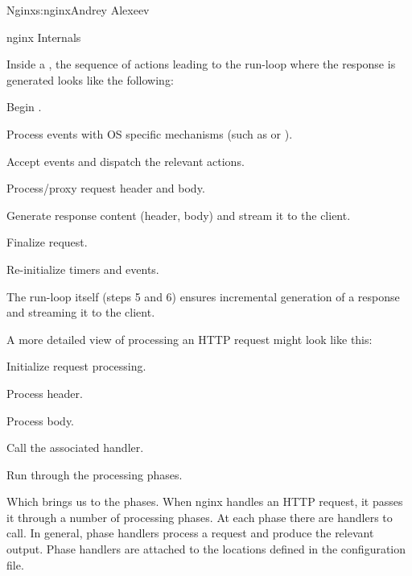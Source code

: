 \begin{aosachapter}{Nginx}{s:nginx}{Andrey Alexeev}
\begin{aosasect1}{nginx Internals}
\begin{aosaitemize}
\end{aosaitemize}

Inside a , the sequence of actions leading to the
run-loop where the response is generated looks like the following:

\begin{aosaenumerate}

\item Begin .

\item Process events with OS specific mechanisms (such as 
  or ).

\item Accept events and dispatch the relevant actions.

\item Process/proxy request header and body.

\item Generate response content (header, body) and stream it to the
  client.

\item Finalize request.

\item Re-initialize timers and events.

\end{aosaenumerate}

The run-loop itself (steps 5 and 6) ensures incremental generation of
a response and streaming it to the client.


A more detailed view of processing an HTTP request might look like
this:

\begin{aosaenumerate}

\item Initialize request processing.

\item Process header.

\item Process body.

\item Call the associated handler.

\item Run through the processing phases.

\end{aosaenumerate}

Which brings us to the phases. When nginx handles an HTTP request, it
passes it through a number of processing phases. At each phase there
are handlers to call. In general, phase handlers process a request and
produce the relevant output. Phase handlers are attached to the
locations defined in the configuration file.


\end{aosasect1}
\end{aosachapter}
